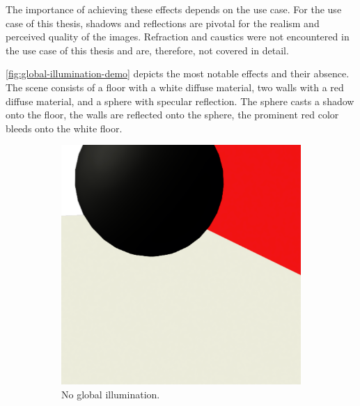 The importance of achieving these effects depends on the use case. For the use case of this thesis, shadows and reflections are pivotal for the realism and perceived quality of the images. Refraction and caustics were not encountered in the use case of this thesis and are, therefore, not covered in detail.

\autoref{fig:global-illumination-demo} depicts the most notable effects and their absence. The scene consists of a floor with a white diffuse material, two walls with a red diffuse material, and a sphere with specular reflection. The sphere casts a shadow onto the floor, the walls are reflected onto the sphere, the prominent red color bleeds onto the white floor.

\begin{figure}[H]
  \centering
  \hspace*{1.8cm}
  \begin{subfigure}[b]{0.3\textwidth}
    \centering
    \includegraphics[width=\textwidth]{resources/global-illumination-demonstration-negative.png}
    \caption{No global illumination.}
    \label{fig:global-illumination-demo-bad}
  \end{subfigure}
  \hfill
  \begin{subfigure}[b]{0.3\textwidth}
    \centering

\end{subfigure}
\end{figure}
